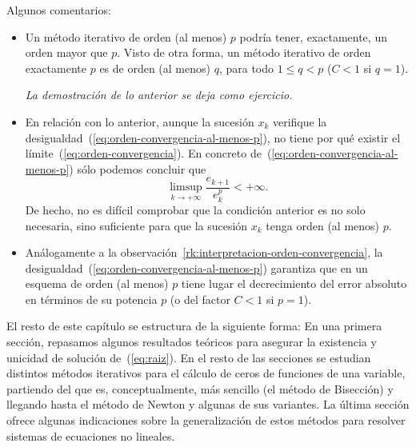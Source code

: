 Algunos comentarios:
\begin{itemize}
\item Un método iterativo de orden (al menos) $p$ podría tener,
  exactamente, un orden mayor que $p$. Visto de otra forma, un método
  iterativo de orden exactamente $p$ es de orden (al menos) $q$, para
  todo $1\le q < p$ ($C<1$ si $q=1$).
  \begin{flushright}
    \vspace{-0.75em}
    \scriptsize \em La demostración de lo anterior se deja como ejercicio.
    \vspace{-0.75em}
  \end{flushright}
\item En relación con lo anterior, aunque la sucesión $x_k$
  verifique la desigualdad~(\ref{eq:orden-convergencia-al-menos-p}),
  no tiene por qué existir el límite~(\ref{eq:orden-convergencia}). En
  concreto de~(\ref{eq:orden-convergencia-al-menos-p}) sólo podemos
  concluir que
  \begin{equation*}
    \limsup_{k\to+\infty} \frac{e_{k+1}}{e_k^p} < +\infty.
  \end{equation*}
  De hecho, no es difícil comprobar que la condición anterior es no
  solo necesaria, sino suficiente para que la sucesión $x_{k}$ tenga
  orden (al menos) $p$.
\item Análogamente a la
  observación~\ref{rk:interpretacion-orden-convergencia}, la
  desigualdad~(\ref{eq:orden-convergencia-al-menos-p}) garantiza que
  en un esquema de orden (al menos) $p$ tiene lugar el decrecimiento del
  error absoluto en términos de su potencia $p$ (o del factor
  $C<1$ si $p=1$).
\end{itemize}

El resto de este capítulo se estructura de la siguiente forma: En una
primera sección, repasamos algunos resultados teóricos para asegurar
la existencia y unicidad de solución de~(\ref{eq:raiz}). En el resto
de las secciones se estudian distintos métodos iterativos para el
cálculo de ceros de funciones de una variable, partiendo del que es,
conceptualmente, más sencillo (el método de Bisección) y llegando
hasta el método de Newton y algunas de sus variantes.  La última
sección ofrece algunas indicaciones sobre la generalización de estos
métodos para resolver sistemas de ecuaciones no lineales.


